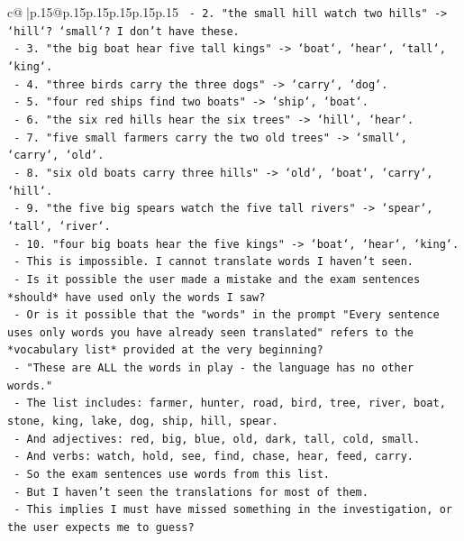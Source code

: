 \documentclass{article}
\begin{document}
{\begin{supertabular}{c@{$\;$}|p{.15\linewidth}@{}p{.15\linewidth}p{.15\linewidth}p{.15\linewidth}p{.15\linewidth}p{.15\linewidth}}
{{{\texttt{    {-} 2. "the small hill watch two hills" {-}> `hill`? `small`? I don't have these.} \\
\texttt{    {-} 3. "the big boat hear five tall kings" {-}> `boat`, `hear`, `tall`, `king`.} \\
\texttt{    {-} 4. "three birds carry the three dogs" {-}> `carry`, `dog`.} \\
\texttt{    {-} 5. "four red ships find two boats" {-}> `ship`, `boat`.} \\
\texttt{    {-} 6. "the six red hills hear the six trees" {-}> `hill`, `hear`.} \\
\texttt{    {-} 7. "five small farmers carry the two old trees" {-}> `small`, `carry`, `old`.} \\
\texttt{    {-} 8. "six old boats carry three hills" {-}> `old`, `boat`, `carry`, `hill`.} \\
\texttt{    {-} 9. "the five big spears watch the five tall rivers" {-}> `spear`, `tall`, `river`.} \\
\texttt{    {-} 10. "four big boats hear the five kings" {-}> `boat`, `hear`, `king`.} \\
\texttt{    {-} This is impossible. I cannot translate words I haven't seen.} \\
\texttt{    {-} Is it possible the user made a mistake and the exam sentences *should* have used only the words I saw?} \\
\texttt{    {-} Or is it possible that the "words" in the prompt "Every sentence uses only words you have already seen translated" refers to the *vocabulary list* provided at the very beginning?} \\
\texttt{    {-} "These are ALL the words in play {-} the language has no other words."} \\
\texttt{    {-} The list includes: farmer, hunter, road, bird, tree, river, boat, stone, king, lake, dog, ship, hill, spear.} \\
\texttt{    {-} And adjectives: red, big, blue, old, dark, tall, cold, small.} \\
\texttt{    {-} And verbs: watch, hold, see, find, chase, hear, feed, carry.} \\
\texttt{    {-} So the exam sentences use words from this list.} \\
\texttt{    {-} But I haven't seen the translations for most of them.} \\
\texttt{    {-} This implies I must have missed something in the investigation, or the user expects me to guess?} \\
}}}
\end{supertabular}}
\end{document}
